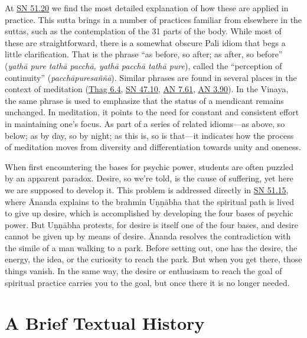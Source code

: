 \documentclass[12pt,openany]{book}%
\begin{document}
At \href{https://suttacentral.net/sn51.20}{SN 51.20} we find the most detailed explanation of how these are applied in practice. This sutta brings in a number of practices familiar from elsewhere in the suttas, such as the contemplation of the 31 parts of the body. While most of these are straightforward, there is a somewhat obscure Pali idiom that begs a little clarification. That is the phrase “as before, so after; as after, so before” (\textit{\textsanskrit{yathā} pure \textsanskrit{tathā} \textsanskrit{pacchā}, \textsanskrit{yathā} \textsanskrit{pacchā} \textsanskrit{tathā} pure}), called the “perception of continuity” (\textit{\textsanskrit{pacchāpuresaññā}}). Similar phrases are found in several places in the context of meditation (\href{https://suttacentral.net/thag6.4}{Thag 6.4}, \href{https://suttacentral.net/sn47.10}{SN 47.10}, \href{https://suttacentral.net/an7.61}{AN 7.61}, \href{https://suttacentral.net/an3.90}{AN 3.90}). In the Vinaya, the same phrase is used to emphasize that the status of a mendicant remains unchanged. In meditation, it points to the need for constant and consistent effort in maintaining one’s focus. As part of a series of related idioms—as above, so below; as by day, so by night; as this is, so is that—it indicates how the process of meditation moves from diversity and differentiation towards unity and oneness.

When first encountering the bases for psychic power, students are often puzzled by an apparent paradox. Desire, so we’re told, is the cause of suffering, yet here we are supposed to develop it. This problem is addressed directly in \href{https://suttacentral.net/sn51.15}{SN 51.15}, where Ānanda explains to the brahmin \textsanskrit{Uṇṇābha} that the spiritual path is lived to give up desire, which is accomplished by developing the four bases of psychic power. But \textsanskrit{Uṇṇābha} protests, for desire is itself one of the four bases, and desire cannot be given up by means of desire. Ānanda resolves the contradiction with the simile of a man walking to a park. Before setting out, one has the desire, the energy, the idea, or the curiosity to reach the park. But when you get there, those things vanish. In the same way, the desire or enthusiasm to reach the goal of spiritual practice carries you to the goal, but once there it is no longer needed.

\section*{A Brief Textual History}
\end{document}

